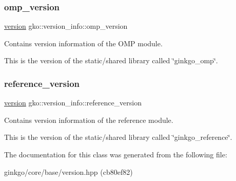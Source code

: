 \subsubsection{\texorpdfstring{omp\+\_\+version}{omp\_version}}
{\footnotesize\ttfamily \hyperlink{structgko_1_1version}{version} gko\+::version\+\_\+info\+::omp\+\_\+version}



Contains version information of the O\+MP module. 

This is the version of the static/shared library called \char`\"{}ginkgo\+\_\+omp\char`\"{}. \mbox{\label{classgko_1_1version__info_a772fcf25f93d719b733602b4bba7d7ec}} 
\subsubsection{\texorpdfstring{reference\+\_\+version}{reference\_version}}
{\footnotesize\ttfamily \hyperlink{structgko_1_1version}{version} gko\+::version\+\_\+info\+::reference\+\_\+version}



Contains version information of the reference module. 

This is the version of the static/shared library called \char`\"{}ginkgo\+\_\+reference\char`\"{}. 

The documentation for this class was generated from the following file\+:\begin{DoxyCompactItemize}
\item 
ginkgo/core/base/version.\+hpp (cb80ef82)\end{DoxyCompactItemize}
